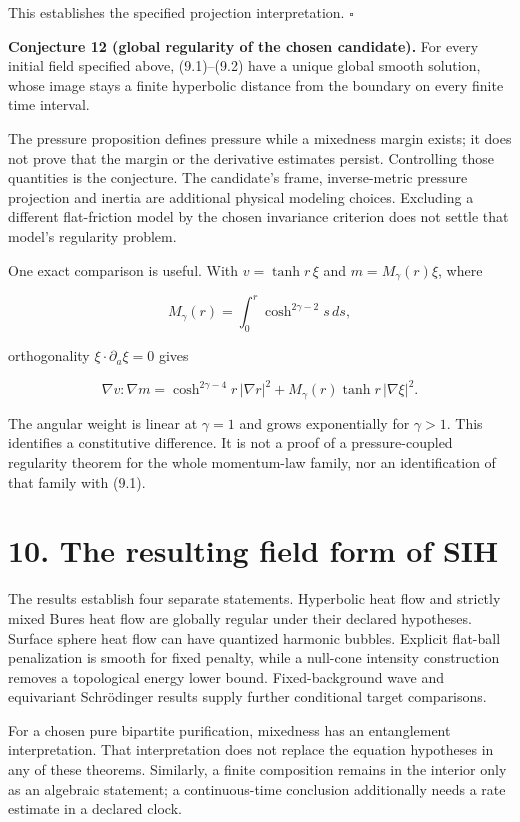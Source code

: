 \documentclass[
  11pt,
  a4paper,
]{article}
\begin{document}
This establishes the specified projection interpretation. \(\square\)

\textbf{Conjecture 12 (global regularity of the chosen candidate).} For every initial field specified above, (9.1)--(9.2) have a unique global smooth solution, whose image stays a finite hyperbolic distance from the boundary on every finite time interval.

The pressure proposition defines pressure while a mixedness margin exists; it does not prove that the margin or the derivative estimates persist. Controlling those quantities is the conjecture. The candidate's frame, inverse-metric pressure projection and inertia are additional physical modeling choices. Excluding a different flat-friction model by the chosen invariance criterion does not settle that model's regularity problem.

One exact comparison is useful. With \(v=\tanh r\,\xi\) and \(m=M_\gamma(r)\xi\), where

\[
M_\gamma(r)=\int_0^r\cosh^{2\gamma-2}s\,ds,
\]

orthogonality \(\xi\cdot\partial_a\xi=0\) gives

\[
\nabla v:\nabla m=
\cosh^{2\gamma-4}r\,|\nabla r|^2
+M_\gamma(r)\tanh r\,|\nabla\xi|^2.
\]

The angular weight is linear at \(\gamma=1\) and grows exponentially for \(\gamma>1\). This identifies a constitutive difference. It is not a proof of a pressure-coupled regularity theorem for the whole momentum-law family, nor an identification of that family with (9.1).

\section{10. The resulting field form of SIH}\label{the-resulting-field-form-of-sih}

The results establish four separate statements. Hyperbolic heat flow and strictly mixed Bures heat flow are globally regular under their declared hypotheses. Surface sphere heat flow can have quantized harmonic bubbles. Explicit flat-ball penalization is smooth for fixed penalty, while a null-cone intensity construction removes a topological energy lower bound. Fixed-background wave and equivariant Schrödinger results supply further conditional target comparisons.

For a chosen pure bipartite purification, mixedness has an entanglement interpretation. That interpretation does not replace the equation hypotheses in any of these theorems. Similarly, a finite composition remains in the interior only as an algebraic statement; a continuous-time conclusion additionally needs a rate estimate in a declared clock.
\end{document}
